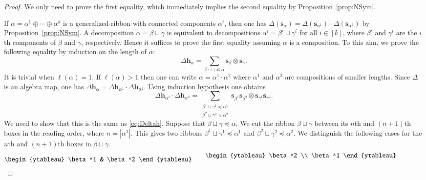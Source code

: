 \documentclass{amsart}
\newtheorem*{Young's Rule}{Young's Rule}
\theoremstyle{definition}
\theoremstyle{remark}
\numberwithin{equation}{section}
\begin{document}
\begin{proof}
We only need to prove the first equality, which immediately implies the second equality by Proposition~\ref{prop:NSym}.

If $\alpha=\alpha^1\oplus\cdots\oplus\alpha^k$ is a generalized-ribbon with connected components $\alpha^i$, then one has $\Delta({{\mathbf s}}_\alpha)=\Delta({{\mathbf s}}_{\alpha^1})\cdots \Delta({{\mathbf s}}_{\alpha^k})$ by  Proposition~\ref{prop:NSym}. A decomposition $\alpha=\beta\sqcup\gamma$ is equivalent to decompositions $\alpha^i=\beta^i\sqcup\gamma^i$ for all $i\in[k]$, where $\beta^i$ and $\gamma^i$ are the $i$th components of $\beta$ and $\gamma$, respectively. Hence it suffices to prove the first equality assuming $\alpha$ is a composition. To this aim, we prove the following equality by induction on the length of $\alpha$:
\begin{equation}\label{eq:Deltah}
\Delta {{\mathbf h}}_\alpha = \sum_{\beta\sqcup\gamma{\operatorname{\preccurlyeq}}\alpha} {{\mathbf s}}_\beta\otimes{{\mathbf s}}_\gamma.
\end{equation}
It is trivial when $\ell(\alpha)=1$. If $\ell(\alpha)>1$ then one can write $\alpha = \alpha^1\cdot\alpha^2$ where $\alpha^1$ and $\alpha^2$ are compositions of smaller lengths. Since $\Delta$ is an algebra map, one has $\Delta {{\mathbf h}}_{\alpha} =\Delta {{\mathbf h}}_{\alpha^1}\cdot\Delta {{\mathbf h}}_{\alpha^2}$. Using induction hypothesis one obtains
\[ \Delta {{\mathbf h}}_{\alpha^1}\cdot\Delta {{\mathbf h}}_{\alpha^2} = \sum_{ \substack{\beta^1\sqcup \gamma^1 {\operatorname{\preccurlyeq}} \alpha^1 \\ \beta^2\sqcup\gamma^2 {\operatorname{\preccurlyeq}} \alpha^2 }} {{\mathbf s}}_{\beta^1}{{\mathbf s}}_{\beta^2} \otimes {{\mathbf s}}_{\gamma^1} {{\mathbf s}}_{\gamma^2}. \]
We need to show that this is the same as \eqref{eq:Deltah}. Suppose that $\beta\sqcup \gamma {\operatorname{\preccurlyeq}} \alpha$. We cut the ribbon $\beta\sqcup \gamma$ between its $n$th and $(n+1)$th boxes in the reading order, where $n=|\alpha^1|$. This gives two ribbons $\beta^1\sqcup\gamma^1 {\operatorname{\preccurlyeq}} \alpha^1$ and $\beta^2\sqcup\gamma^2 {\operatorname{\preccurlyeq}}\alpha^2$. We distinguish the following cases for the $n$th and $(n+1)$th boxes in $\beta\sqcup\gamma$.
\begin{equation}\label{eq:BetaGamma} 
\begin{ytableau} \beta^1 & \beta^2 \end{ytableau} \qquad
\raisebox{6pt}{\begin{ytableau}  \beta^2 \\ \beta^1 \end{ytableau}} \qquad\qquad

\end{equation}
\end{proof}
\end{document}
